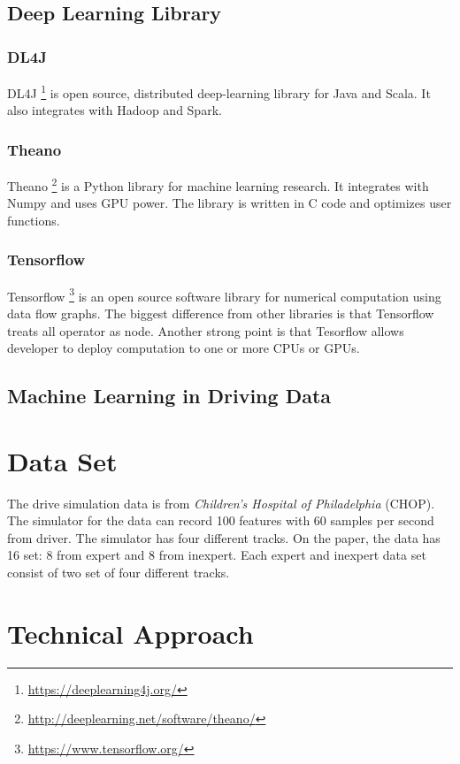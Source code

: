 \documentclass[12pt]{article}
\begin{document}
\subsection{Deep Learning Library}
\subsubsection{DL4J}
DL4J \footnote{\url{https://deeplearning4j.org/}} is open source, distributed deep-learning library for Java and Scala. It also integrates with Hadoop and Spark. 

\subsubsection{Theano}
Theano \footnote{\url{http://deeplearning.net/software/theano/}} is a Python library for machine learning research. It integrates with Numpy and uses GPU power. The library is written in C code and optimizes user functions.

\subsubsection{Tensorflow}
Tensorflow \footnote{\url{https://www.tensorflow.org/}} is an open source software library for numerical computation using data flow graphs. The biggest difference from other libraries is that Tensorflow treats all operator as node. Another strong point is that Tesorflow allows developer to deploy computation to one or more CPUs or GPUs. 


\subsection{Machine Learning in Driving Data}



\section{Data Set}
The drive simulation data is from \textit{Children's Hospital of Philadelphia} (CHOP). The simulator for the data can record 100 features with 60 samples per second from driver. The simulator has four different tracks. On the paper, the data has 16 set: 8 from expert and 8 from inexpert. Each expert and inexpert data set consist of two set of four different tracks.

\section{Technical Approach}
\end{document}
